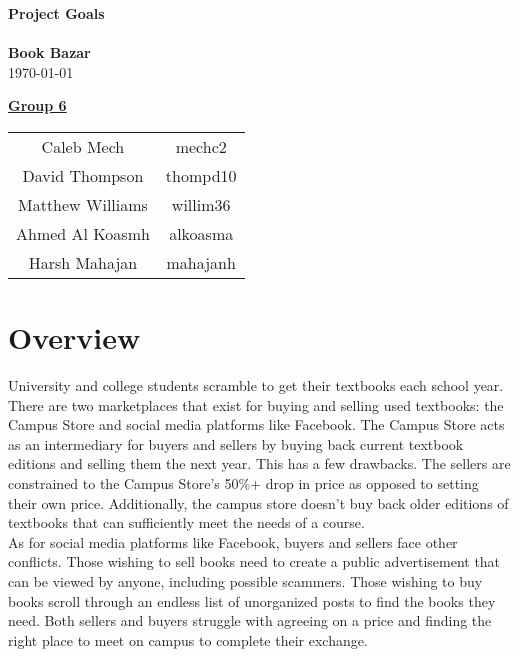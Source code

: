 \documentclass[fullpage]{article}
\begin{document}
\vspace*{\fill}
\begin{center}

  {\Huge \textbf{Project Goals}}\\
\hrulefill\\[2mm]
  {\huge \textbf{Book Bazar}}\\[2mm]
{\large \today}\\[15mm]
{\large
\underline{\textbf{Group 6}}\\
\begin{tabular}{ c c }

 Caleb Mech & mechc2\\ 
 David Thompson & thompd10\\
 Matthew Williams & willim36\\
 Ahmed Al Koasmh & alkoasma\\
 Harsh Mahajan	& mahajanh    
\end{tabular}
}

\end{center}

\vspace*{\fill}

\newpage

\section{Overview}
University and college students scramble to get their textbooks each school year. There are two marketplaces that exist for buying and selling used textbooks: the Campus Store and social media platforms like Facebook. The Campus Store acts as an intermediary for buyers and sellers by buying back current textbook editions and selling them the next year. This has a few drawbacks. The sellers are constrained to the Campus Store’s 50\%+ drop in price as opposed to setting their own price. Additionally, the campus store doesn't buy back older editions of textbooks that can sufficiently meet the needs of a course.\\

As for social media platforms like Facebook, buyers and sellers face other conflicts. Those wishing to sell books need to create a public advertisement that can be viewed by anyone, including possible scammers. Those wishing to buy books scroll through an endless list of unorganized posts to find the books they need. Both sellers and buyers struggle with agreeing on a price and finding the right place to meet on campus to complete their exchange.\\
\end{document}

